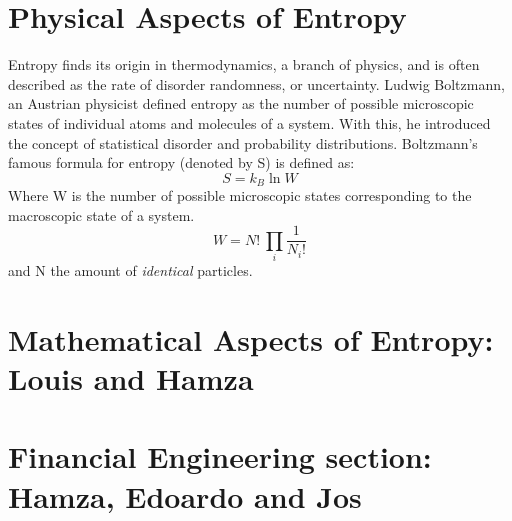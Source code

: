 \documentclass[11pt]{article}
\begin{document}
\section{Physical Aspects of Entropy}
Entropy finds its origin in thermodynamics, a branch of physics, and is often described as the rate of disorder randomness, or uncertainty. Ludwig Boltzmann, an Austrian physicist defined entropy as the number of possible microscopic states of individual atoms and molecules of a system. With this, he introduced the concept of statistical disorder and probability distributions. Boltzmann's famous formula for entropy (denoted by S) is defined as:
\begin{equation*}
    S = k_{B} \ln W
\end{equation*}
Where W is the number of possible microscopic states corresponding to the macroscopic state of a system.
\begin{equation*}
    W = N! \ \prod_{i}^{} \frac{1}{N_{i}!}
\end{equation*}
and N the amount of \textit{identical} particles.

\section{Mathematical Aspects of Entropy: Louis and Hamza}
\section{Financial Engineering section: Hamza, Edoardo and Jos}
\end{document}

